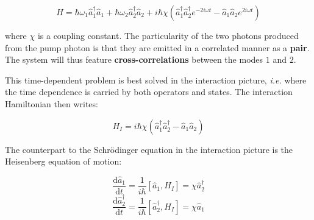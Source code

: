 \begin{equation}
    H=\hbar \omega_1 \hat{a}_1^{\dagger} \hat{a}_1+ \hbar \omega_2 \hat{a}_2^{\dagger} \hat{a}_2 + i \hbar \chi (\hat{a}_1^{\dagger}  \hat{a}_2^{\dagger} e^{-2i\omega t} - \hat{a}_1 \hat{a}_2 e^{2i\omega t})
\end{equation}

\noindent where $\chi$ is a coupling constant. The particularity of the two photons produced from the pump photon is that they are emitted in a correlated manner as a \textbf{pair}. The system will thus feature \textbf{cross-correlations} between the modes $1$ and $2$. 



This time-dependent problem is best solved in the interaction picture, {\it i.e.} where the time dependence is carried by both operators and states. The interaction Hamiltonian then writes:

\begin{equation}
    H_I=i \hbar \chi (\hat{a}_1^{\dagger}  \hat{a}_2^{\dagger} - \hat{a}_1 \hat{a}_2)
\end{equation}

\noindent The counterpart to the Schrödinger equation in the interaction picture is the Heisenberg equation of motion:

\begin{equation}
    \frac{\mathrm{d}\hat{a}_1}{\mathrm{d}t}= \frac{1}{i\hbar} [\hat{a}_1,H_I]=\chi \hat{a}_2^{\dagger}
\end{equation}
\begin{equation}
    \frac{\mathrm{d}\hat{a}_2^{\dagger}}{\mathrm{d}t}= \frac{1}{i\hbar} [\hat{a}_2^{\dagger},H_I]=\chi \hat{a}_1
\end{equation}

